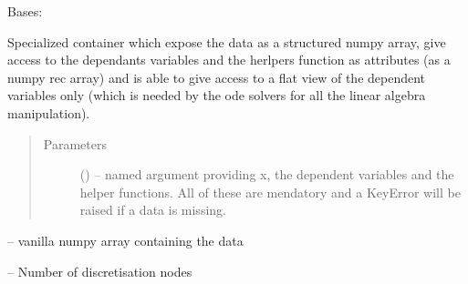 \documentclass[letterpaper,10pt,english]{sphinxmanual}
\begin{document}
\begin{fulllineitems}
\label{\detokenize{triflow.core:triflow.core.fields.BaseFields}}
Bases: 

Specialized container which expose the data as a structured numpy array,
give access to the dependants variables and the herlpers function as
attributes (as a numpy rec array) and is able to give access to a flat
view of the dependent variables only (which is needed by the ode
solvers for all the linear algebra manipulation).
\begin{quote}\begin{description}
\item[{Parameters}] \leavevmode
{} () -- named argument providing x, the dependent variables and the helper functions. All of these are mendatory and a KeyError will be raised if a data is missing.

\end{description}\end{quote}

\begin{fulllineitems}
\label{\detokenize{triflow.core:triflow.core.fields.BaseFields.array}}
 -- vanilla numpy array containing the data

\end{fulllineitems}


\begin{fulllineitems}
\label{\detokenize{triflow.core:triflow.core.fields.BaseFields.size}}
 -- Number of discretisation nodes

\end{fulllineitems}


\begin{fulllineitems}
\label{\detokenize{triflow.core:triflow.core.fields.BaseFields.copy}}
\end{fulllineitems}



\end{fulllineitems}
\end{document}
